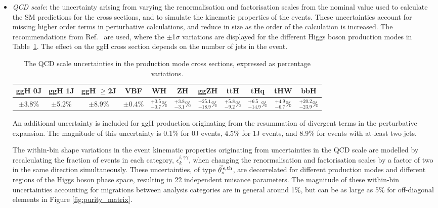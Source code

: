 \begin{itemize}
    \item \textit{QCD scale}: the uncertainty arising from varying the renormalisation and factorisation scales from the nominal value used to calculate the SM predictions for the cross sections, and to simulate the kinematic properties of the events. These uncertainties account for missing higher order terms in perturbative calculations, and reduce in size as the order of the calculation is increased. The recommendations from Ref.~\cite{deFlorian:2016spz} are used, where the $\pm$1$\sigma$ variations are displayed for the different Higgs boson production modes in Table~\ref{tab:qcdscale_variation}. The effect on the ggH cross section depends on the number of jets in the event.
    
    \begin{table}[htb]
        \caption[QCD scale uncertainties in production mode cross sections]{The QCD scale uncertainties in the production mode cross sections, expressed as percentage variations.}
        \label{tab:qcdscale_variation}
        \centering
        \footnotesize
        \setlength{\tabcolsep}{3pt}
        \renewcommand{\arraystretch}{2}
        \begin{tabular}{c|c|c|c|c|c|c|c|c|c|c}
            ggH 0J & ggH 1J & ggH $\geq$2J & VBF & WH & ZH & ggZH & ttH & tHq & tHW & bbH   \\ \hline
            $\pm$3.8\%  & $\pm$5.2\%  & $\pm$8.9\% & $\pm$0.4\% & $^{+0.5}_{-0.7}$\% & $^{+3.8}_{-3.1}$\%  & $^{+25.1}_{-18.9}$\% & $^{+5.8}_{-9.2}$\% & $^{+6.5}_{-14.9}$\% & $^{+4.9}_{-6.7}$\% & $^{+20.2}_{-23.9}$\% \\ 
        \end{tabular}
    \end{table}

    \noindent
    An additional uncertainty is included for ggH production originating from the resummation of divergent terms in the perturbative expansion. The magnitude of this uncertainty is 0.1\% for 0J events, 4.5\% for 1J events, and 8.9\% for events with at-least two jets.
    
    The within-bin shape variations in the event kinematic properties originating from uncertainties in the QCD scale are modelled by recalculating the fraction of events in each category, $\epsilon^{i,\gamma\gamma}_{k}$, when changing the renormalisation and factorisation scales by a factor of two in the same direction simultaneously. These uncertainties, of type $\vec{\theta}^{\,\epsilon,{\rm{th}}}_{s}$, are decorrelated for different production modes and different regions of the Higgs boson phase space, resulting in 22 independent nuisance parameters. The magnitude of these within-bin uncertainties accounting for migrations between analysis categories are in general around 1\%, but can be as large as 5\% for off-diagonal elements in Figure \ref{fig:purity_matrix}.
    

\end{itemize}

